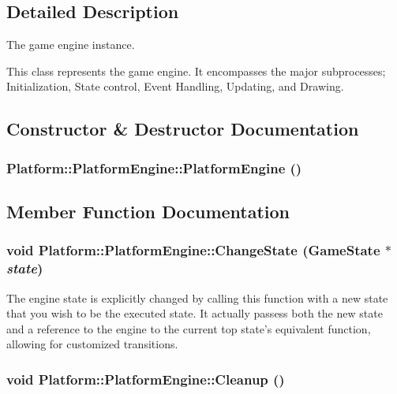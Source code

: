 \subsection{Detailed Description}
The game engine instance. 

This class represents the game engine. It encompasses the major subprocesses; Initialization, State control, Event Handling, Updating, and Drawing. 

\subsection{Constructor \& Destructor Documentation}
\hypertarget{class_platform_1_1_platform_engine_dbbbe20e4646a36123681e4c69f621f2}{
\subsubsection[{PlatformEngine}]{\setlength{\rightskip}{0pt plus 5cm}Platform::PlatformEngine::PlatformEngine ()}}
\label{d2/dd5/class_platform_1_1_platform_engine_dbbbe20e4646a36123681e4c69f621f2}




\subsection{Member Function Documentation}
\hypertarget{class_platform_1_1_platform_engine_23a7914b737c272ce1a46fc1ae1decbb}{
\subsubsection[{ChangeState}]{\setlength{\rightskip}{0pt plus 5cm}void Platform::PlatformEngine::ChangeState ({\bf GameState} $\ast$ {\em state})}}
\label{d2/dd5/class_platform_1_1_platform_engine_23a7914b737c272ce1a46fc1ae1decbb}


The engine state is explicitly changed by calling this function with a new state that you wish to be the executed state. It actually passess both the new state and a reference to the engine to the current top state's equivalent function, allowing for customized transitions. \hypertarget{class_platform_1_1_platform_engine_71ec02a1e29f8fe078bc458627ff0f4c}{
\subsubsection[{Cleanup}]{\setlength{\rightskip}{0pt plus 5cm}void Platform::PlatformEngine::Cleanup ()}}
\label{d2/dd5/class_platform_1_1_platform_engine_71ec02a1e29f8fe078bc458627ff0f4c}


